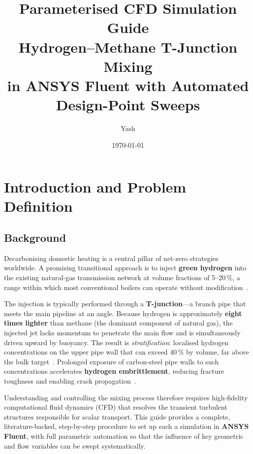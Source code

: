 \documentclass[12pt,a4paper]{report}
\title{\textbf{Parameterised CFD Simulation Guide}\\[6pt]
       \Large Hydrogen--Methane T-Junction Mixing\\
       in ANSYS Fluent with Automated Design-Point Sweeps}
\author{Yash}
\date{\today}
\begin{document}
\maketitle
\thispagestyle{empty}

\tableofcontents
\newpage


\chapter{Introduction and Problem Definition}
\label{ch:intro}

\section{Background}

Decarbonising domestic heating is a central pillar of net-zero strategies worldwide.
A promising transitional approach is to inject \textbf{green hydrogen} into the existing
natural-gas transmission network at volume fractions of 5--20\,\%, a range within
which most conventional boilers can operate without modification~\cite{Eames2022}.

The injection is typically performed through a \textbf{T-junction}---a branch pipe
that meets the main pipeline at an angle.  Because hydrogen is approximately
\textbf{eight times lighter} than methane (the dominant component of natural gas),
the injected jet lacks momentum to penetrate the main flow and is simultaneously
driven upward by buoyancy.  The result is \textit{stratification}: localised
hydrogen concentrations on the upper pipe wall that can exceed 40\,\% by volume,
far above the bulk target~\cite{Eames2022}.  Prolonged exposure of carbon-steel
pipe walls to such concentrations accelerates \textbf{hydrogen embrittlement},
reducing fracture toughness and enabling crack propagation~\cite{Laureys2022}.

Understanding and controlling the mixing process therefore requires
high-fidelity computational fluid dynamics (CFD) that resolves the transient
turbulent structures responsible for scalar transport.  This guide provides a
complete, literature-backed, step-by-step procedure to set up such a simulation
in \textbf{ANSYS Fluent}, with full parametric automation so that the influence
of key geometric and flow variables can be swept systematically.
\end{document}
